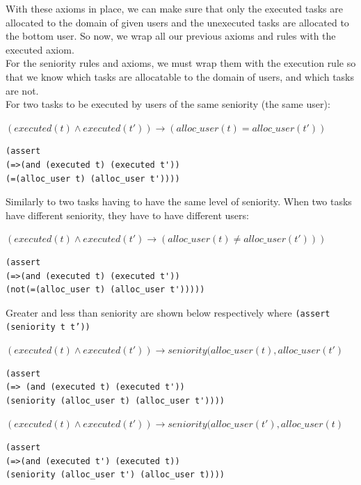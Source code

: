 \documentclass[a4paper]{report}
\begin{document}
With these axioms in place, we can make sure that only the executed tasks are allocated to the domain of given users and the unexecuted tasks are allocated to the bottom user. So now, we wrap all our previous axioms and rules with the executed axiom.\\

For the seniority rules and axioms, we must wrap them with the execution rule so that we know which tasks are allocatable to the domain of users, and which tasks are not. \\
For two tasks to be executed by users of the same seniority (the same user):
\begin{center}
$(executed(t) \wedge executed(t\ensuremath{'})) \longrightarrow (alloc\_user(t) = alloc\_user(t\ensuremath{'}))$
\end{center}
\begin{lstlisting}[frame=single]
(assert 
(=>(and (executed t) (executed t'))
(=(alloc_user t) (alloc_user t'))))
\end{lstlisting}
Similarly to two tasks having to have the same level of seniority. When two tasks have different seniority, they have to have different users:
\begin{center}
$(executed(t) \wedge executed(t\ensuremath{'}) \longrightarrow (alloc\_user(t) \neq alloc\_user(t\ensuremath{'})))$
\end{center}

\begin{lstlisting}[frame=single]
(assert 
(=>(and (executed t) (executed t'))
(not(=(alloc_user t) (alloc_user t')))))
\end{lstlisting}
Greater and less than seniority are shown below respectively where \texttt{(assert (seniority t t'))}
\begin{center}
$(executed(t) \wedge executed(t\ensuremath{'})) \longrightarrow seniority(alloc\_user(t), alloc\_user(t\ensuremath{'})$
\end{center}
\begin{lstlisting}[frame=single]
(assert 
(=> (and (executed t) (executed t'))
(seniority (alloc_user t) (alloc_user t'))))
\end{lstlisting}
\begin{center}
$(executed(t) \wedge executed(t\ensuremath{'})) \longrightarrow seniority(alloc\_user(t\ensuremath{'}), alloc\_user(t)$
\end{center}
\begin{lstlisting}[frame=single]
(assert 
(=>(and (executed t') (executed t))
(seniority (alloc_user t') (alloc_user t))))
\end{lstlisting}
\end{document}
